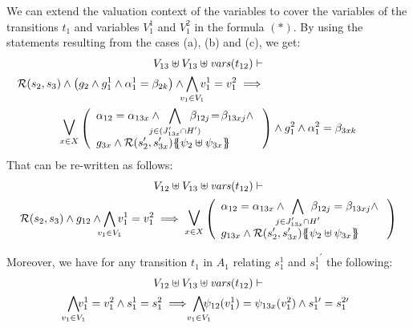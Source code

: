 \documentclass[runningheads]{llncs}
\begin{document}
\begin{enumerate}
We can extend the valuation context of the variables to cover the variables of the transitions $t_1$ and variables $V_1^1$ and $V_1^2$ in the formula $(*)$.
By using the statements resulting from the cases (a), (b) and (c), we get:
\begin{multline*}
V_{13} \uplus V_{13}  \uplus \fvars{t_{12}} \vdash\\
\mathcal{R}\mpar{s_2, s_{3}} \wedge \mpar{g_2 \wedge g^1_1 \wedge \alpha^1_1=\beta_{2k}}\wedge \bigwedge_\subbox{v_1\in V_1}  v^1_1=v^2_1 %
\implies  \hspace{12em}\\
\operatorname*{\bigsymb{\bigvee}}_{x \in X} \mpar{\everymath{\displaystyle}
\begin{array}{l}
			\alpha_{12} = \alpha_{13x} \wedge \bigwedge_\subbox{j \in (J'_{13x} \cap H')} \beta_{12j}\! =\! \beta_{13xj}\nwedge\\
			  g_{3x} \wedge \mathcal{R}\mpar{s'_2, s'_{3x}}\psubst{\psi_2 \uplus \psi_{3x}}
		\end{array}}  \wedge g^2_1 \wedge \alpha^2_1=\beta_{3xk} 
\end{multline*}	
That can be re-written as follows:
\begin{multline*}
V_{12} \uplus V_{13} \uplus \fvars{t_{12}}  \vdash\\
\mathcal{R}\mpar{s_2, s_{3}} \wedge g_{12}  \land \bigwedge_\subbox{v_1\in V_1} v^1_1=v^2_1
\implies  \operatorname*{\bigsymb{\bigvee}}_{x \in X} \mpar{\everymath{\displaystyle}
\begin{array}{l}
			\alpha_{12} = \alpha_{13x} \wedge \bigwedge_\subbox{j \in J'_{13x} \cap H'} \beta_{12j} = \beta_{13xj} \nwedge\\
			g_{13x} \wedge \mathcal{R}\mpar{s'_2, s'_{3x}}\psubst{\psi_2 \uplus \psi_{3x}}
		\end{array}}   
\end{multline*}	


Moreover, we have  for any transition $t_1 $ in $A_1$ relating $s^1_1$ and ${s^1_1}^{\prime}$ the following:
\begin{multline*}
V_{12} \uplus V_{13}  \uplus \fvars{t_{12}} \vdash\\
\bigwedge_\subbox{v_1\in V_1}\!\! v^1_1=v^2_1  \wedge s^1_1 = s^2_1 \implies \bigwedge_\subbox{v_1\in V_1}\!\! \psi_{12}(v^1_1)=\psi_{13x}(v^2_1)  \wedge s^{1\prime}_1 = s^{2\prime}_1 
\end{multline*}


\end{enumerate}
\end{document}
